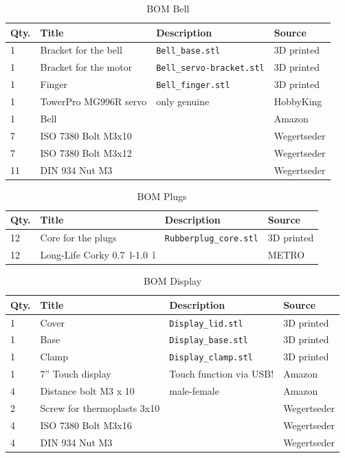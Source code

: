 \documentclass[a4paper]{scrartcl}
\begin{document}
\begin{table}
\caption{BOM Bell}
\begin{tabular}{|l|l|l|l|}
\hline
Qty. & Title & Description & Source\\
\hline\hline
1 & Bracket for the bell & \texttt{Bell\_base.stl} & 3D printed\\
\hline
1 & Bracket for the motor & \texttt{Bell\_servo-bracket.stl}& 3D printed\\
\hline 
1 & Finger & \texttt{Bell\_finger.stl} & 3D printed\\
\hline
1 & TowerPro MG996R servo & only genuine & HobbyKing\\
\hline
1 & Bell &  & Amazon \\
\hline
7 & ISO 7380 Bolt M3x10  & & Wegertseder\\
\hline
7 & ISO 7380 Bolt M3x12  & & Wegertseder\\
\hline
11 & DIN 934 Nut M3& & Wegertseder\\
\hline 
 
\end{tabular}
\end{table}

\begin{table}
\caption{BOM Plugs}
\begin{tabular}{|l|l|l|l|}
\hline
Qty. & Title & Description & Source\\
\hline\hline
12 & Core for the plugs & \texttt{Rubberplug\_core.stl} & 3D printed\\
\hline
12 & Long-Life Corky \SI{0.7}{\litre}-\SI{1.0}{\litre} &  & METRO\\
\hline 
\end{tabular}
\end{table}

\begin{table}
\caption{BOM Display}
\begin{tabular}{|l|l|l|l|}
\hline
Qty. & Title & Description & Source\\
\hline\hline
1 & Cover & \texttt{Display\_lid.stl} & 3D printed \\
\hline 
1 & Base & \texttt{Display\_base.stl} & 3D printed\\
\hline
1 & Clamp & \texttt{Display\_clamp.stl} & 3D printed\\
\hline
1 & 7'' Touch display & Touch function via USB! & Amazon\\
\hline
4 & Distance bolt M3 x 10 & male-female &Amazon\\
\hline
2 & Screw for thermoplasts 3x10& & Wegertseder\\
\hline
4 & ISO 7380 Bolt M3x16  & & Wegertseder\\
\hline
4 & DIN 934 Nut M3 & & Wegertseder\\
\hline 
\end{tabular}
\end{table}
\end{document}
